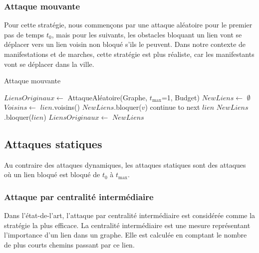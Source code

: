 \subsubsection{Attaque mouvante}\label{subsubsec:attaque_mouvante}

Pour cette stratégie, nous commençons par une attaque aléatoire pour le premier pas de temps ${t_{0}}$, mais pour les suivants, les obstacles bloquant un lien vont se déplacer vers un lien voisin non bloqué s'ils le peuvent.
Dans notre contexte de manifestations et de marches, cette stratégie est plus réaliste, car les manifestants vont se déplacer dans la ville.
\begin{algorithm}[H]
\caption{Attaque mouvante}
\begin{algorithmic}
    \State $LiensOriginaux \gets$ AttaqueAléatoire(Graphe, ${t_{\max}}$=1, Budget)
        \State $NewLiens \gets$ $\emptyset$
            \State $Voisins \gets$ $lien$.voisins()
                    \State $NewLiens$.bloquer($v$)
                    \State continue to next $lien$
                \EndIf
            \EndFor
            \State $NewLiens$.bloquer($lien$)
        \EndFor
        \State $LiensOriginaux \gets$ $NewLiens$
    \EndFor
\end{algorithmic}
\end{algorithm}
\subsection{Attaques statiques}\label{subsec:attaques_statiques}

Au contraire des attaques dynamiques, les attaques statiques sont des attaques où un lien bloqué est bloqué de ${t_{0}}$ à ${t_{\max}}$.

\subsubsection{Attaque par centralité intermédiaire}\label{subsubsec:attaque_centralite_intermediaire}

Dans l'état-de-l'art, l'attaque par centralité intermédiaire est considérée comme la stratégie la plus efficace.
La centralité intermédiaire est une mesure représentant l'importance d'un lien dans un graphe.
Elle est calculée en comptant le nombre de plus courts chemins passant par ce lien.

